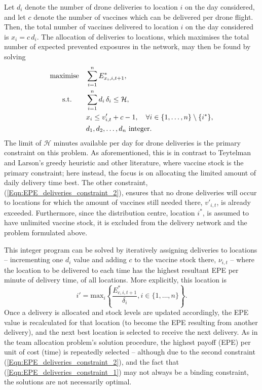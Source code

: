 \documentclass[10pt,letterpaper]{article}
\begin{document}
Let $d_{i}$ denote the number of drone deliveries to location $i$ on the day considered, and let $c$ denote the number of vaccines which can be delivered per drone flight. Then, the total number of vaccines delivered to location $i$ on the day considered is $x_{i} = c \, d_{i}$. The allocation of deliveries to locations, which maximises the total number of expected prevented exposures in the network, may then be found by solving 
\begin{align}
    \text{maximise\quad} & \sum_{i=1}^{n} E^{*}_{x_{i},i,t+1}, \\
    \label{Eqn:EPE_deliveries_constraint_1}
    \text{s.t.\qquad} & \sum_{i=1}^{n} d_{i}\,\delta_{i} \leq \mathcal{H}, \\
    \label{Eqn:EPE_deliveries_constraint_2}
    &x_{i} \leq v'_{i,t} + c - 1, \quad \forall{i} \in \{1, \dots,n \} \setminus \{i^*\},\\
    &d_{1}, d_{2}, \ldots, d_{n} \text{ integer}.
\end{align}
The limit of $\mathcal{H}$ minutes available per day for drone deliveries is the primary constraint on this problem. As aforementioned, this is in contrast to Teytelman and Larson's greedy heuristic and other literature, where vaccine stock is the primary constraint; here instead, the focus is on allocating the limited amount of daily delivery time best. The other constraint, (\ref{Eqn:EPE_deliveries_constraint_2}), ensures that no drone deliveries will occur to locations for which the amount of vaccines still needed there, $v'_{i,t}$, is already exceeded. Furthermore, since the distribution centre, location $i^*$, is assumed to have unlimited vaccine stock, it is excluded from the delivery network and the problem formulated above.

This integer program can be solved by iteratively assigning deliveries to locations -- incrementing one $d_{i}$ value and adding $c$ to the vaccine stock there, $\nu_{i,t}$ -- where the location to be delivered to each time has the highest resultant EPE per minute of delivery time, of all locations. More explicitly, this location is $$i' = \text{max}_{i} \left\{ \frac{E^{*}_{c,i,t+1}}{\delta_{i}}, i \in \{1, \dots, n\} \right\}.$$ 
Once a delivery is allocated and stock levels are updated accordingly, the EPE value is recalculated for that location (to become the EPE resulting from another delivery), and the next best location is selected to receive the next delivery. As in the team allocation problem's solution procedure, the highest payoff (EPE) per unit of cost (time) is repeatedly selected -- although due to the second constraint (\ref{Eqn:EPE_deliveries_constraint_2}), and the fact that (\ref{Eqn:EPE_deliveries_constraint_1}) may not always be a binding constraint, the solutions are not necessarily optimal.
\end{document}
